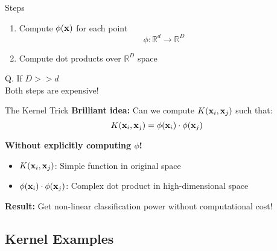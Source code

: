 \documentclass{beamer}
\begin{document}
	\begin{frame}{Steps}
	    \begin{enumerate}
	        \item Compute $\phi(\mathbf{x})$ for each point \\
	        \begin{equation*}
	            \phi: \mathbb{R}^{d} \rightarrow \mathbb{R}^{D}
	        \end{equation*}
	        \item Compute dot products over $\mathbb{R}^{D}$ space
	    \end{enumerate}
	    \hspace{0.1cm} Q. If $D >> d$ \\
	    \hspace{0.6cm} Both steps are expensive!
	\end{frame}
	\begin{frame}{The Kernel Trick}
	\textbf{Brilliant idea:} Can we compute $K(\mathbf{x}_{i}, \mathbf{x}_{j})$ such that:
	$$K(\mathbf{x}_{i}, \mathbf{x}_{j}) = \phi(\mathbf{x}_{i}) \cdot \phi(\mathbf{x}_{j})$$
	
	\textbf{Without explicitly computing $\phi$!}
	
	\begin{itemize}
		\item $K(\mathbf{x}_{i}, \mathbf{x}_{j})$: Simple function in original space
		\item $\phi(\mathbf{x}_{i}) \cdot \phi(\mathbf{x}_{j})$: Complex dot product in high-dimensional space
	\end{itemize}
	
	\textbf{Result:} Get non-linear classification power without computational cost!
	\end{frame}

\subsection{Kernel Examples}

	{
	
}
\end{document}
